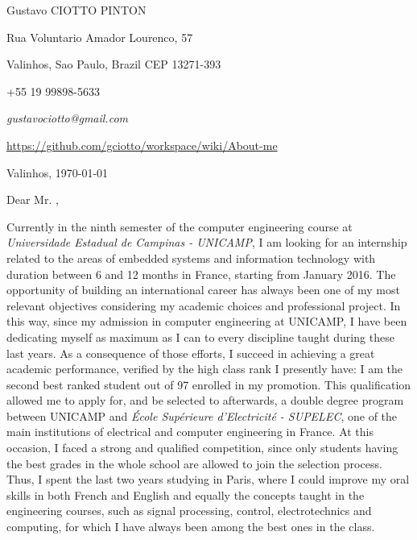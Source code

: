 \documentclass[12pt, a4paper]{article}
\begin{document}
\pagestyle{empty} 

Gustavo CIOTTO PINTON

Rua Voluntario Amador Lourenco, 57

Valinhos, Sao Paulo, Brazil CEP 13271-393

+55 19 99898-5633	

\textit{gustavociotto@gmail.com}

\url{https://github.com/gciotto/workspace/wiki/About-me}
\begin{flushright}
Valinhos,  \today





\end{flushright}

Dear Mr. , 

\vspace{12pt}
Currently in the ninth semester of the computer engineering course at
\textit{Universidade Estadual de Campinas - UNICAMP}, I am looking for an
internship related to the areas of embedded systems and information technology
with duration between 6 and 12 months in France, starting from January 2016. The opportunity of
building an international career has always been one of my most relevant
objectives considering my academic choices and professional project. In this
way, since my admission in computer engineering at UNICAMP, I have been
dedicating myself as maximum as I can to every discipline taught during these
last years. As a consequence of those efforts, I succeed in achieving a great
academic performance, verified by the high class rank I presently have: I am the second
best ranked student out of 97 enrolled in my promotion. This qualification
allowed me to apply for, and be selected to afterwards, a double degree program
between UNICAMP and \textit{École Supérieure d'Electricité - SUPELEC}, one of
the main institutions of electrical and computer engineering in France. At this
occasion, I faced a strong and qualified competition, since only students
having the best grades in the whole school are allowed to join the selection
process. Thus, I spent the last two years studying in Paris, where I could
improve my oral skills in both French and English and equally the concepts
taught in the engineering courses, such as signal processing, control,
electrotechnics and computing, for which I have always been among the best ones
in the class.
\end{document}
